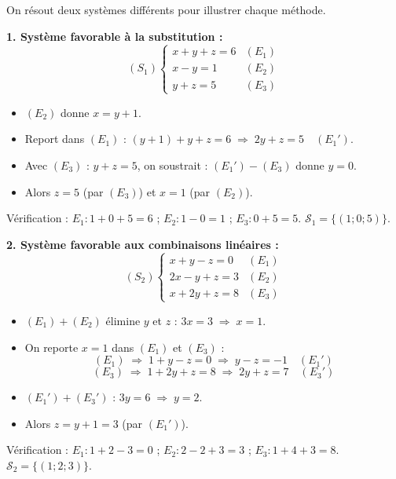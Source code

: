 \documentclass[11pt]{article}
\begin{document}
\begin{corrige}
On résout deux systèmes différents pour illustrer chaque méthode.

\textbf{1. Système favorable à la substitution :}
\[ (S_1) \begin{cases} x + y + z = 6 & (E_1) \\ x - y = 1 & (E_2) \\ y + z = 5 & (E_3) \end{cases} \]
\begin{itemize}
\item $(E_2)$ donne $x = y + 1$.
\item Report dans $(E_1)$ : $(y+1) + y + z = 6 \;\Rightarrow\; 2y + z = 5 \quad (E_1')$.
\item Avec $(E_3)$ : $y + z = 5$, on soustrait : $(E_1') - (E_3)$ donne $y = 0$.
\item Alors $z = 5$ (par $(E_3)$) et $x = 1$ (par $(E_2)$).
\end{itemize}
Vérification : $E_1: 1+0+5=6$ ; $E_2: 1-0=1$ ; $E_3: 0+5=5$. $\mathcal{S}_1 = \{(1 ; 0 ; 5)\}$.

\textbf{2. Système favorable aux combinaisons linéaires :}
\[ (S_2) \begin{cases} x + y - z = 0 & (E_1) \\ 2x - y + z = 3 & (E_2) \\ x + 2y + z = 8 & (E_3) \end{cases} \]
\begin{itemize}
\item $(E_1) + (E_2)$ élimine $y$ et $z$ : $3x = 3 \;\Rightarrow\; x = 1$.
\item On reporte $x=1$ dans $(E_1)$ et $(E_3)$ :
\[ (E_1) \;\Rightarrow\; 1 + y - z = 0 \;\Rightarrow\; y - z = -1 \quad (E_1') \]
\[ (E_3) \;\Rightarrow\; 1 + 2y + z = 8 \;\Rightarrow\; 2y + z = 7 \quad (E_3') \]
\item $(E_1') + (E_3')$ : $3y = 6 \;\Rightarrow\; y = 2$.
\item Alors $z = y + 1 = 3$ (par $(E_1')$).
\end{itemize}
Vérification : $E_1: 1+2-3=0$ ; $E_2: 2-2+3=3$ ; $E_3: 1+4+3=8$. $\mathcal{S}_2 = \{(1 ; 2 ; 3)\}$.
\end{corrige}
\end{document}
